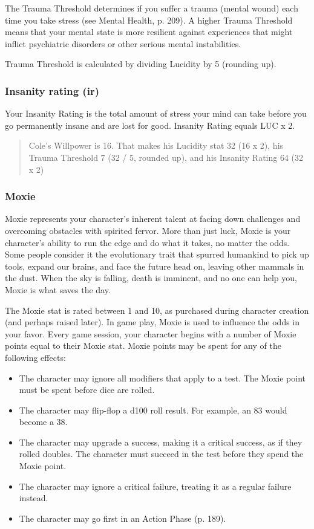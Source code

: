 The Trauma Threshold determines if you suffer a trauma (mental wound) each time you take stress (see Mental Health, p. 209). A higher Trauma Threshold means that your mental state is more resilient against experiences that might inflict psychiatric disorders or other serious mental instabilities.

Trauma Threshold is calculated by dividing Lucidity by 5 (rounding up).

\subsubsection{Insanity rating (ir)}
\label{sec:insanity-rating-ir}

Your Insanity Rating is the total amount of stress your mind can take before you go permanently insane and are lost for good. Insanity Rating equals LUC x 2.

\begin{quotation}
Cole's Willpower is 16. That makes his Lucidity stat 32 (16 x 2), his Trauma Threshold 7 (32 / 5, rounded up), and his Insanity Rating 64 (32 x 2)
\end{quotation}

\subsubsection{Moxie}
\label{sec:moxie}

Moxie represents your character's inherent talent at facing down challenges and overcoming obstacles with spirited fervor. More than just luck, Moxie is your character's ability to run the edge and do what it takes, no matter the odds. Some people consider it the evolutionary trait that spurred humankind to pick up tools, expand our brains, and face the future head on, leaving other mammals in the dust. When the sky is falling, death is imminent, and no one can help you, Moxie is what saves the day.

The Moxie stat is rated between 1 and 10, as purchased during character creation (and perhaps raised later). In game play, Moxie is used to influence the odds in your favor. Every game session, your character begins with a number of Moxie points equal to their Moxie stat. Moxie points may be spent for any of the following effects:

\begin{itemize}
\item The character may ignore all modifiers that apply to a test. The Moxie point must be spent before dice are rolled.
\item The character may flip-flop a d100 roll result. For example, an 83 would become a 38.
\item The character may upgrade a success, making it a critical success, as if they rolled doubles. The character must succeed in the test before they spend the Moxie point.
\item The character may ignore a critical failure, treating it as a regular failure instead.
\item The character may go first in an Action Phase (p. 189).
\end{itemize}

